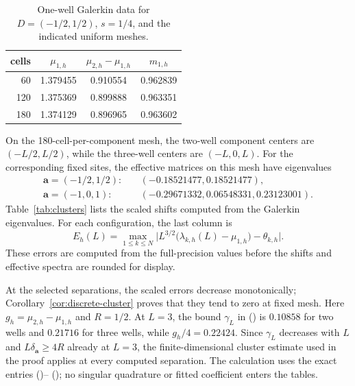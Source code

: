 \documentclass[twoside,10pt]{article}
\numberwithin{equation}{section}
\theoremstyle{slbody}
\theoremstyle{definition}
\newcommand{\abs}[1]{\lvert #1\rvert}
\renewcommand{\eqref}[1]{%
  \textup{{\normalfont(\oldstylenums{\ref{#1}}}\normalfont)}}
\begin{document}
\begin{table}[ht]
\centering
\begin{tabular}{rccc}
\hline
cells & $\mu_{1,h}$ & $\mu_{2,h}-\mu_{1,h}$ & $m_{1,h}$\\ \hline
60  & 1.379455 & 0.910554 & 0.962839\\
120 & 1.375369 & 0.899888 & 0.963351\\
180 & 1.374129 & 0.896965 & 0.963602\\
\hline
\end{tabular}
\caption{One-well Galerkin data for $D=(-1/2,1/2)$, $s=1/4$, and the
indicated uniform meshes.}
\label{tab:mesh}
\end{table}

On the 180-cell-per-component mesh, the two-well component centers are
$(-L/2,L/2)$, while the three-well centers are $(-L,0,L)$.  For the corresponding
fixed sites, the effective matrices on this mesh have eigenvalues
\begin{align*}
 \mathbf a=(-1/2,1/2):&\quad (-0.18521477,0.18521477),\\
 \mathbf a=(-1,0,1):&\quad
 (-0.29671332,0.06548331,0.23123001).
\end{align*}
Table~\ref{tab:clusters} lists the scaled shifts computed from the Galerkin
eigenvalues.  For each configuration, the last column is
\begin{equation}\label{eq:scaled-cluster-error}
 E_h(L)=\max_{1\leq k\leq N}
 \abs{L^{3/2}\bigl(\lambda_{k,h}(L)-\mu_{1,h}\bigr)-\theta_{k,h}}.
\end{equation}
These errors are computed from the full-precision values before the shifts
and effective spectra are rounded for display.

At the selected separations, the scaled errors decrease monotonically;
Corollary~\ref{cor:discrete-cluster} proves that they tend to zero at fixed
mesh.  Here $g_h=\mu_{2,h}-\mu_{1,h}$ and $R=1/2$.  At $L=3$, the bound
$\gamma_L$ in \eqref{eq:gamma-L} is $0.10858$ for two wells and $0.21716$ for
three wells, while $g_h/4=0.22424$.  Since
$\gamma_L$ decreases with $L$ and $L\delta_{\mathbf a}\geq4R$ already at
$L=3$, the finite-dimensional cluster estimate used in the proof applies at
every computed separation.  The calculation uses the exact entries
\eqref{eq:cell-diagonal}--\eqref{eq:cell-offdiagonal}; no singular quadrature
or fitted coefficient enters the tables.
\end{document}
